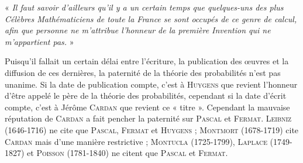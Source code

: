 \begin{His}
\vspace{0.4cm}

    « \textit{Il faut savoir d'ailleurs qu'il y a un certain temps que quelques-uns des plus Célèbres Mathématiciens de toute la France se sont occupés de ce genre de calcul, afin que personne ne m'attribue l'honneur de la première Invention qui ne m'appartient pas. }»

\vspace{0.4cm}

Puisqu'il fallait un certain délai entre l'écriture, la publication des œuvres et la diffusion de ces dernières, la paternité de la théorie des probabilités n'est pas unanime. Si la date de publication compte, c'est à \textsc{Huygens} que revient l'honneur d'être appelé le père de la théorie des probabilités, cependant si la date d'écrit compte, c'est à Jérôme \textsc{Cardan} que revient ce « titre ». Cependant la mauvaise réputation de \textsc{Cardan} a fait pencher la paternité sur \textsc{Pascal} et \textsc{Fermat}. \textsc{Leibniz} (1646-1716) ne cite que \textsc{Pascal}, \textsc{Fermat} et \textsc{Huygens} ; \textsc{Montmort} (1678-1719) cite \textsc{Cardan} mais d'une manière restrictive ; \textsc{Montucla} (1725-1799), \textsc{Laplace} (1749-1827) et \textsc{Poisson} (1781-1840) ne citent que \textsc{Pascal} et \textsc{Fermat}.

 
 
\end{His}
